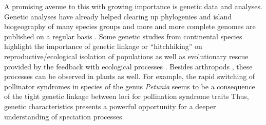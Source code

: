 \documentclass[a4paper]{scrartcl}
\begin{document}
A promising avenue to this with growing importance is genetic data and analyses.
Genetic analyses have already helped clearing up phylogenies and island biogeography of many species groups \cite{austinReconstructingIslandRadiation2004}\cite{emersonDiversificationForestBeetle2005}\cite{valenteUsingMolecularPhylogenies2018}%
and more and more complete genomes are published on a regular basis \cite{alonso-blanco135GenomesReveal2016} \cite{lewinEarthBioGenomeProject2018}.
Some genetic studies from continental species highlight the importance of genetic linkage or ``hitchhiking'' on reproductive/ecological isolation of populations \cite{hawthorneGeneticLinkageEcological2001}\cite{viaGeneticMosaicSuggests2008}
as well as evolutionary rescue provided by the feedback with ecological processes \cite{schiffersLimitedEvolutionaryRescue2012}.
Besides arthropods \cite{hawthorneGeneticLinkageEcological2001}, these processes can be observed in plants as well. %
For example, the rapid switching of pollinator syndromes in species of the genus \textit{Petunia} %
seems to be a consequence of the tight genetic linkage between loci for pollination syndrome traits \cite{hermannTightGeneticLinkage2013}
Thus, genetic characteristics presents a powerful opportunity for a deeper understanding of speciation processes.


\end{document}
